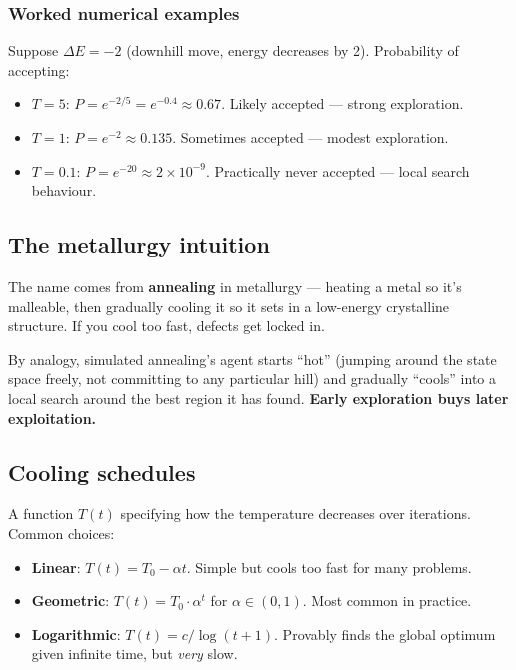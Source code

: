 \documentclass[11pt, a4paper]{article}
\begin{document}
\subsubsection*{Worked numerical examples}

\begin{exbox}
Suppose $\Delta E = -2$ (downhill move, energy decreases by 2). Probability of accepting:
\begin{itemize}[leftmargin=*, itemsep=0pt, topsep=0pt]
  \item $T = 5$: $P = e^{-2/5} = e^{-0.4} \approx 0.67$. Likely accepted — strong exploration.
  \item $T = 1$: $P = e^{-2} \approx 0.135$. Sometimes accepted — modest exploration.
  \item $T = 0.1$: $P = e^{-20} \approx 2 \times 10^{-9}$. Practically never accepted — local search behaviour.
\end{itemize}
\end{exbox}

\subsection{The metallurgy intuition}

The name comes from \textbf{annealing} in metallurgy — heating a metal so it's malleable, then gradually cooling it so it sets in a low-energy crystalline structure. If you cool too fast, defects get locked in.

By analogy, simulated annealing's agent starts ``hot'' (jumping around the state space freely, not committing to any particular hill) and gradually ``cools'' into a local search around the best region it has found. \textbf{Early exploration buys later exploitation.}

\subsection{Cooling schedules}

\begin{defbox}
A function $T(t)$ specifying how the temperature decreases over iterations. Common choices:
\begin{itemize}[itemsep=0pt, topsep=0pt]
  \item \textbf{Linear}: $T(t) = T_0 - \alpha t$. Simple but cools too fast for many problems.
  \item \textbf{Geometric}: $T(t) = T_0 \cdot \alpha^t$ for $\alpha \in (0, 1)$. Most common in practice.
  \item \textbf{Logarithmic}: $T(t) = c / \log(t + 1)$. Provably finds the global optimum given infinite time, but \emph{very} slow.
\end{itemize}
\end{defbox}
\end{document}
